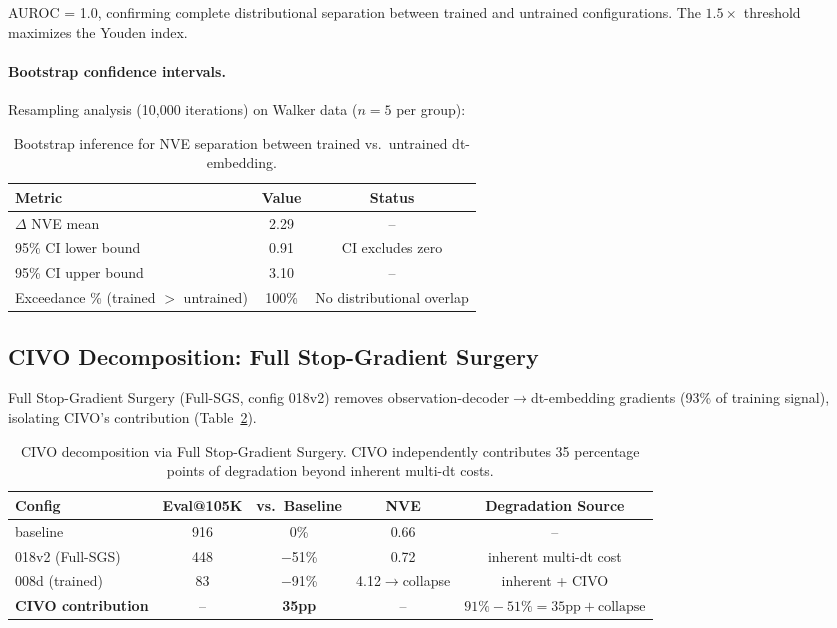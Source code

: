 \documentclass[10pt,letterpaper]{article}
\begin{document}
AUROC = 1.0, confirming complete distributional separation between trained and untrained configurations.
The $1.5\times$ threshold maximizes the Youden index.

\paragraph{Bootstrap confidence intervals.}
Resampling analysis (10,000 iterations) on Walker data ($n=5$ per group):

\begin{table}[h]
\centering
\caption{Bootstrap inference for NVE separation between trained vs.\ untrained dt-embedding.}
\label{tab:bootstrap}
\begin{tabular}{lcc}
\toprule
Metric & Value & Status \\
\midrule
$\Delta$ NVE mean & 2.29 & -- \\
95\% CI lower bound & 0.91 & CI excludes zero \\
95\% CI upper bound & 3.10 & -- \\
Exceedance \% (trained $>$ untrained) & 100\% & No distributional overlap \\
\bottomrule
\end{tabular}
\end{table}

\subsection{CIVO Decomposition: Full Stop-Gradient Surgery}
\label{sec:sgs}

Full Stop-Gradient Surgery (Full-SGS, config 018v2) removes observation-decoder$\to$dt-embedding gradients (93\% of training signal), isolating CIVO's contribution (Table~\ref{tab:civo_decomposition}).

\begin{table}[h]
\centering
\caption{CIVO decomposition via Full Stop-Gradient Surgery. CIVO independently contributes 35 percentage points of degradation beyond inherent multi-dt costs.}
\label{tab:civo_decomposition}
\begin{tabular}{lcccc}
\toprule
Config & Eval@105K & vs.\ Baseline & NVE & Degradation Source \\
\midrule
baseline & 916 & 0\% & 0.66 & -- \\
018v2 (Full-SGS) & 448 & $-$51\% & 0.72 & inherent multi-dt cost \\
008d (trained) & 83 & $-$91\% & 4.12$\to$collapse & inherent + CIVO \\
\midrule
\textbf{CIVO contribution} & -- & \textbf{35pp} & -- & $91\% - 51\% = 35\text{pp} + \text{collapse}$ \\
\bottomrule
\end{tabular}
\end{table}
\end{document}
